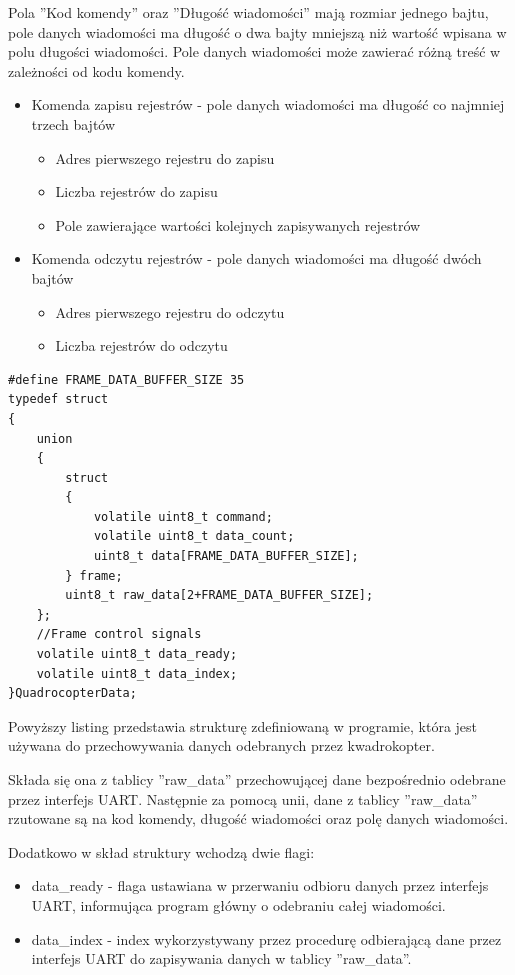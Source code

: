 Pola ''Kod komendy'' oraz ''Długość wiadomości'' mają rozmiar jednego bajtu, pole danych wiadomości ma długość o dwa bajty mniejszą niż wartość wpisana w polu długości wiadomości.
Pole danych wiadomości może zawierać różną treść w zależności od kodu komendy. 
\begin{itemize}
	\item Komenda zapisu rejestrów - pole danych wiadomości ma długość co najmniej trzech bajtów
	\begin{itemize}
		\item Adres pierwszego rejestru do zapisu
		\item Liczba rejestrów do zapisu
		\item Pole zawierające wartości kolejnych zapisywanych rejestrów
	\end{itemize}
	\item Komenda odczytu rejestrów - pole danych wiadomości ma długość dwóch bajtów
	\begin{itemize}
		\item Adres pierwszego rejestru do odczytu
		\item Liczba rejestrów do odczytu
	\end{itemize} 	
\end{itemize} 

\begin{lstlisting}
#define FRAME_DATA_BUFFER_SIZE 35
typedef struct
{
    union
    {
        struct
        {
            volatile uint8_t command;
            volatile uint8_t data_count;
            uint8_t data[FRAME_DATA_BUFFER_SIZE];
        } frame;
        uint8_t raw_data[2+FRAME_DATA_BUFFER_SIZE];
    };
    //Frame control signals
    volatile uint8_t data_ready;
    volatile uint8_t data_index;
}QuadrocopterData;
\end{lstlisting}

Powyższy listing przedstawia strukturę zdefiniowaną w programie, która jest używana do przechowywania danych odebranych  przez kwadrokopter.

Składa się ona z tablicy ''raw\_data'' przechowującej dane bezpośrednio odebrane przez interfejs UART. Następnie za pomocą unii, dane z tablicy ''raw\_data'' rzutowane są na kod komendy, długość wiadomości oraz polę danych wiadomości.

Dodatkowo w skład struktury wchodzą dwie flagi:
\begin{itemize}
	\item data\_ready - flaga ustawiana w przerwaniu odbioru danych przez interfejs UART, informująca program główny o odebraniu całej wiadomości.
	\item data\_index - index wykorzystywany przez procedurę odbierającą dane przez interfejs UART do zapisywania danych w tablicy ''raw\_data''. 
\end{itemize}

